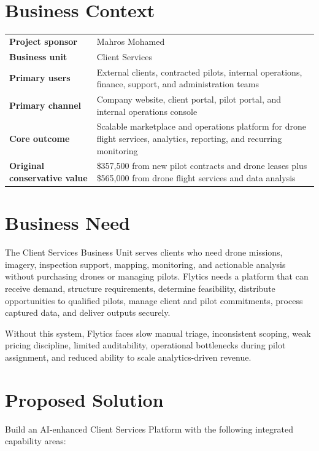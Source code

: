 \documentclass[11pt,a4paper]{article}
\begin{document}
\section{Business Context}

\begin{longtable}{>{\bfseries}p{}p{}}
\toprule
Project sponsor & Mahros Mohamed \\
Business unit & Client Services \\
Primary users & External clients, contracted pilots, internal operations, finance, support, and administration teams \\
Primary channel & Company website, client portal, pilot portal, and internal operations console \\
Core outcome & Scalable marketplace and operations platform for drone flight services, analytics, reporting, and recurring monitoring \\
Original conservative value & \$357,500 from new pilot contracts and drone leases plus \$565,000 from drone flight services and data analysis \\
\bottomrule
\end{longtable}

\section{Business Need}

The Client Services Business Unit serves clients who need drone missions, imagery, inspection support, mapping, monitoring, and actionable analysis without purchasing drones or managing pilots. Flytics needs a platform that can receive demand, structure requirements, determine feasibility, distribute opportunities to qualified pilots, manage client and pilot commitments, process captured data, and deliver outputs securely.

Without this system, Flytics faces slow manual triage, inconsistent scoping, weak pricing discipline, limited auditability, operational bottlenecks during pilot assignment, and reduced ability to scale analytics-driven revenue.

\section{Proposed Solution}

Build an AI-enhanced Client Services Platform with the following integrated capability areas:
\end{document}
